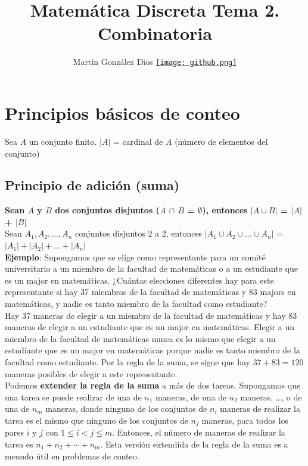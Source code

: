 \documentclass{article}
\title{Matemática Discreta Tema 2. Combinatoria}
\author{Martín González Dios 
\href{https://github.com/martindios}{\texttt{[image: github.png]}}}
\begin{document}
\maketitle

\section{Principios básicos de conteo}
Sea $A$ un conjunto finito. $|A|$ = cardinal de $A$ (número de elementos del conjunto)
\subsection{Principio de adición (suma)}
\textbf{Sean $A$ y $B$ dos conjuntos disjuntos ($A$ $\cap$ $B$ = $\emptyset$), entonces $|A \cup B|$ = $|A|$ + $|B|$} \\
Sean $A_1, A_2, ..., A_n$ conjuntos disjuntos 2 a 2, entonces $|A_1 \cup A_2 \cup ...  \cup A_n|$ = $|A_1|+|A_2|+...+|A_n|$ \\

\textbf{Ejemplo}: Supongamos que se elige como representante para un comité universitario a un miembro de la facultad de matemáticas o a un estudiante que es un major en matemáticas. ¿Cuántas elecciones diferentes hay para este representante si hay 37 miembros de la facultad de matemáticas y 83 majors en matemáticas, y nadie es tanto miembro de la facultad como estudiante? \\

Hay 37 maneras de elegir a un miembro de la facultad de matemáticas y hay 83 maneras de elegir a un estudiante que es un major en matemáticas. Elegir a un miembro de la facultad de matemáticas nunca es lo mismo que elegir a un estudiante que es un major en matemáticas porque nadie es tanto miembro de la facultad como estudiante. Por la regla de la suma, se sigue que hay $37 + 83 = 120$ maneras posibles de elegir a este representante.\\

Podemos \textbf{extender la regla de la suma} a más de dos tareas. Supongamos que una tarea se puede realizar de una de $n_1$ maneras, de una de $n_2$ maneras, \ldots, o de una de $n_m$ maneras, donde ninguno de los conjuntos de $n_i$ maneras de realizar la tarea es el mismo que ninguno de los conjuntos de $n_j$ maneras, para todos los pares $i$ y $j$ con $1 \leq i < j \leq m$. Entonces, el número de maneras de realizar la tarea es $n_1 + n_2 + \cdots + n_m$. Esta versión extendida de la regla de la suma es a menudo útil en problemas de conteo.
\end{document}
